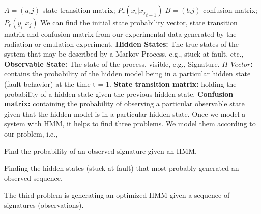 $A = (a_ij)$ state transition matrix;  \hspace{0.3cm} $P_r(x_i | {x_j}_{t-1})$
$B = (b_ij)$ confusion matrix;     \hspace{0.3cm}        $P_r(y_i | x_j)$
We can find the initial state probability vector, state transition matrix and confusion matrix  from our experimental data generated by the radiation or emulation experiment.
\textbf{Hidden States:} The true states of the system that may be described by a Markov Process, e.g., stuck-at-fault, etc.,
\textbf{Observable State:} The state of the process, visible, e.g., Signature.
\textbf{$\Pi$ $Vector$:} contains the probability of the hidden model being in a particular hidden state (fault behavior) at the time t = 1.
\textbf{State transition matrix:}  holding the probability of a hidden state given the previous hidden state.
\textbf{Confusion matrix:} containing the probability of observing a particular observable state given that the hidden model is in a particular hidden state. 
Once we model a system with HMM, it helps to find three problems. We model them according to our problem, i.e.,
\begin{tcolorbox}[width=\textwidth,colback={gray},title={Evaluation },colbacktitle=gray,coltitle=black]  
Find the probability of an observed signature given an HMM.  
\end{tcolorbox}
\begin{tcolorbox}[width=\textwidth,colback={gray},title={Decoding },colbacktitle=gray,coltitle=black]  
Finding the hidden states (stuck-at-fault) that most probably generated an observed sequence. 
\end{tcolorbox}
\begin{tcolorbox}[width=\textwidth,colback={gray},title={Learning },colbacktitle=gray,coltitle=black]  
The third problem is generating an optimized HMM given a sequence of signatures (observations).
\end{tcolorbox}

